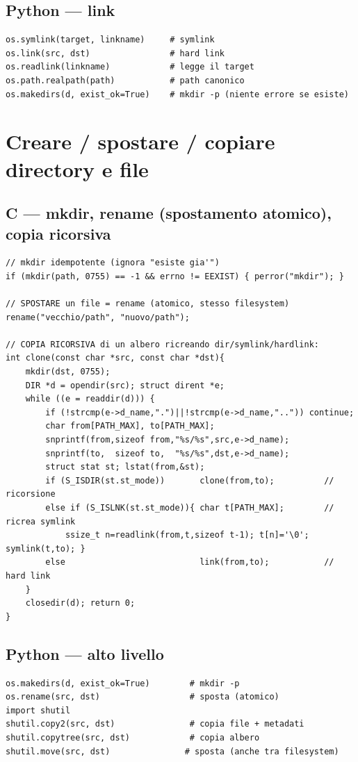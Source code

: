 \documentclass[10pt,a4paper]{article}
\begin{document}
\subsection{Python --- link}
\begin{lstlisting}[style=py]
os.symlink(target, linkname)     # symlink
os.link(src, dst)                # hard link
os.readlink(linkname)            # legge il target
os.path.realpath(path)           # path canonico
os.makedirs(d, exist_ok=True)    # mkdir -p (niente errore se esiste)
\end{lstlisting}

\section{Creare / spostare / copiare directory e file}

\subsection{C --- mkdir, rename (spostamento atomico), copia ricorsiva}
\begin{lstlisting}[style=c]
// mkdir idempotente (ignora "esiste gia'")
if (mkdir(path, 0755) == -1 && errno != EEXIST) { perror("mkdir"); }

// SPOSTARE un file = rename (atomico, stesso filesystem)
rename("vecchio/path", "nuovo/path");

// COPIA RICORSIVA di un albero ricreando dir/symlink/hardlink:
int clone(const char *src, const char *dst){
    mkdir(dst, 0755);
    DIR *d = opendir(src); struct dirent *e;
    while ((e = readdir(d))) {
        if (!strcmp(e->d_name,".")||!strcmp(e->d_name,"..")) continue;
        char from[PATH_MAX], to[PATH_MAX];
        snprintf(from,sizeof from,"%s/%s",src,e->d_name);
        snprintf(to,  sizeof to,  "%s/%s",dst,e->d_name);
        struct stat st; lstat(from,&st);
        if (S_ISDIR(st.st_mode))       clone(from,to);          // ricorsione
        else if (S_ISLNK(st.st_mode)){ char t[PATH_MAX];        // ricrea symlink
            ssize_t n=readlink(from,t,sizeof t-1); t[n]='\0'; symlink(t,to); }
        else                           link(from,to);           // hard link
    }
    closedir(d); return 0;
}
\end{lstlisting}

\subsection{Python --- alto livello}
\begin{lstlisting}[style=py]
os.makedirs(d, exist_ok=True)        # mkdir -p
os.rename(src, dst)                  # sposta (atomico)
import shutil
shutil.copy2(src, dst)               # copia file + metadati
shutil.copytree(src, dst)            # copia albero
shutil.move(src, dst)               # sposta (anche tra filesystem)
\end{lstlisting}
\end{document}
